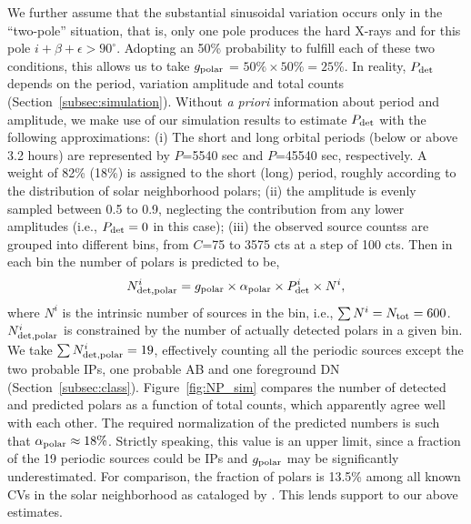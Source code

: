 \documentclass[fleqn,usenatbib]{mnras}
\begin{document}
We further assume that the substantial sinusoidal variation occurs only in the ``two-pole'' situation, that is, only one pole produces the hard X-rays and for this pole $i+\beta+\epsilon > 90^{\circ}$. 
Adopting an 50\% probability to fulfill each of these two conditions, this allows us to take $g_{\rm polar}$ = $50\%\times50\% = 25\%$. In reality, $P_{\rm det}$ depends on the period, variation amplitude and total counts (Section~\ref{subsec:simulation}). 
Without {\it a priori} information about period and amplitude, we make use of our simulation results to estimate $P_{\rm det}$ with the following approximations:
(i) The short and long orbital periods (below or above 3.2 hours) are represented by $P$=5540 sec and $P$=45540 sec, respectively. A weight of 82\% (18\%) is assigned to the short (long) period, roughly according to the distribution of solar neighborhood polars; 
(ii) the amplitude is evenly sampled between 0.5 to 0.9, neglecting the contribution from any lower amplitudes (i.e., $P_{\rm det} = 0$ in this case);
(iii) the observed source countss are grouped into different bins, from $C$=75 to 3575 cts at a step of 100 cts.  
Then in each bin the number of polars is predicted to be,
\begin{equation}
N_{\rm det,polar}^i =  g_{\rm polar} \times \alpha_{\rm polar} \times P_{\rm det}^i \times N^i,
\end{equation}
where $N^i$ is the intrinsic number of sources in the bin, i.e., $\sum{N^i}=N_{\rm tot}=600$.  
$N_{\rm det,polar}^i$ is constrained by the number of actually detected polars in a given bin. We take $\sum{N_{\rm det,polar}^i} = 19$, effectively counting all the periodic sources except the two probable IPs, one probable AB and one foreground DN (Section~\ref{subsec:class}).
Figure~\ref{fig:NP_sim} compares the number of detected and predicted polars as a function of total counts, which apparently agree well with each other.  
The required normalization of the predicted numbers is such that $\alpha_{\rm polar} \approx 18\%$. Strictly speaking, this value is an upper limit, since a fraction of the 19 periodic sources could be IPs and $g_{\rm polar}$ may be significantly underestimated. 
For comparison, the fraction of polars is 13.5\% among all known CVs in the solar neighborhood as cataloged by \citet{2003A&A...404..301R}. This lends support to our above estimates.
\end{document}
